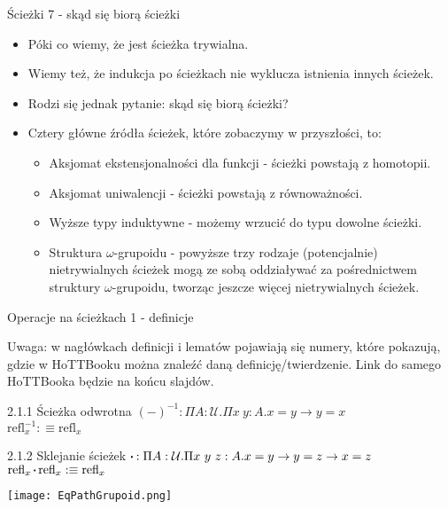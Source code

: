 \documentclass{beamer}
\newcommand{\defn}{:\equiv}
\newcommand{\U}{\mathcal{U}}
\newcommand{\refl}[1]{\text{refl}_{#1}}
\newcommand{\inv}[1]{#1^{-1}}
\newcommand{\sq}{\mathbin{\vcenter{\hbox{\rule{.3ex}{.3ex}}}}}
\begin{document}
\begin{frame}{Ścieżki 7 - skąd się biorą ścieżki}
\begin{itemize}
	\item Póki co wiemy, że jest ścieżka trywialna.
	\item Wiemy też, że indukcja po ścieżkach nie wyklucza istnienia innych ścieżek.
	\item Rodzi się jednak pytanie: skąd się biorą ścieżki?
	\item Cztery główne źródła ścieżek, które zobaczymy w przyszłości, to:
	\begin{itemize}
		\item Aksjomat ekstensjonalności dla funkcji - ścieżki powstają z homotopii.
		\item Aksjomat uniwalencji - ścieżki powstają z równoważności.
		\item Wyższe typy induktywne - możemy wrzucić do typu dowolne ścieżki.
		\item Struktura $\omega$-grupoidu - powyższe trzy rodzaje (potencjalnie) nietrywialnych ścieżek mogą ze sobą oddziaływać za pośrednictwem struktury $\omega$-grupoidu, tworząc jeszcze więcej nietrywialnych ścieżek. 
	\end{itemize}
\end{itemize}
\end{frame}

\begin{frame}{Operacje na ścieżkach 1 - definicje}

Uwaga: w nagłówkach definicji i lematów pojawiają się numery, które pokazują, gdzie w HoTTBooku można znaleźć daną definicję/twierdzenie. Link do samego HoTTBooka będzie na końcu slajdów.

\begin{block}{2.1.1 Ścieżka odwrotna}
$\inv{(-)} : \Pi A : \U. \Pi x\ y : A. x = y \to y = x$ \\
$\inv{\refl{x}} \defn \refl{x}$
\end{block}

\begin{block}{2.1.2 Sklejanie ścieżek}
$\sq : \Pi A : \U. \Pi x\ y\ z : A. x = y \to y = z \to x = z$ \\
$\refl{x} \sq \refl{x} \defn \refl{x}$
\end{block}

\texttt{[image: EqPathGrupoid.png]}

\end{frame}
\end{document}

